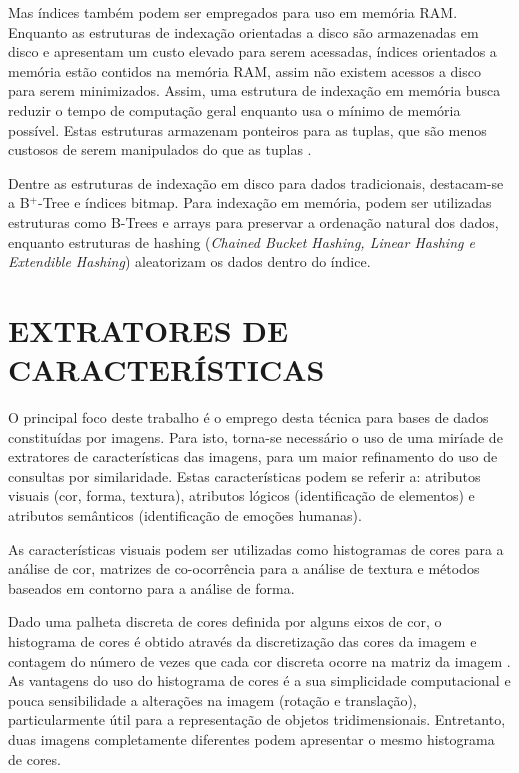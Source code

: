 Mas índices também podem ser empregados para uso em memória RAM. Enquanto as estruturas de indexação orientadas a disco são armazenadas em disco e apresentam
um custo elevado para serem acessadas, índices orientados a memória estão contidos na memória RAM, assim não existem acessos
a disco para serem minimizados. Assim, uma estrutura de indexação em memória busca reduzir o tempo de computação geral enquanto usa
o mínimo de memória possível. Estas estruturas armazenam ponteiros para as tuplas, que são menos custosos de serem manipulados do que as tuplas \cite{Lehman1986}.\par
				
Dentre as estruturas de indexação em disco para dados tradicionais, destacam-se a B$^{+}$-Tree e índices bitmap. Para indexação em memória,
podem ser utilizadas estruturas como B-Trees e arrays para preservar a ordenação natural dos dados, enquanto estruturas de hashing
(\textit{Chained Bucket Hashing, Linear Hashing e Extendible Hashing}) aleatorizam os dados dentro do índice.

\section{EXTRATORES DE CARACTERÍSTICAS}
\label{sec:extcarac}
O principal foco deste trabalho é o emprego desta técnica para bases de dados constituídas por imagens. Para isto, torna-se necessário o uso de uma miríade de extratores de características
das imagens, para um maior refinamento do uso de consultas por similaridade. Estas características podem se referir a: atributos visuais (cor, forma, textura), atributos lógicos (identificação
de elementos) e atributos semânticos (identificação de emoções humanas).\par

As características visuais podem ser utilizadas como histogramas de cores para a análise de cor, matrizes de co-ocorrência para a análise de textura e
métodos baseados em contorno para a análise de forma. \par

Dado uma palheta discreta de cores definida por alguns eixos de cor, o histograma de cores é obtido através da discretização das cores da imagem e contagem
do número de vezes que cada cor discreta ocorre na matriz da imagem \cite{Swain1991}. As vantagens do uso do histograma de cores é a sua simplicidade computacional e pouca
sensibilidade a alterações na imagem (rotação e translação), particularmente útil para a representação de objetos tridimensionais. Entretanto, duas imagens completamente 
diferentes podem apresentar o mesmo histograma de cores.\par

